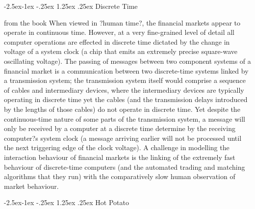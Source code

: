 \documentclass{article}
\makeatletter
\renewcommand\paragraph{\@startsection{paragraph}{4}{\z@}%
	{-2.5ex\@plus -1ex \@minus -.25ex}%
	{1.25ex \@plus .25ex}%
	{\normalfont\normalsize\bfseries}}
\makeatother
\begin{document}
\paragraph{Discrete Time} 

from the book
When viewed in ?human time?, the financial markets appear to operate in continuous time. However, at a very fine-grained level of detail all computer operations are effected in discrete time dictated by the change in voltage of a system clock (a chip that emits an extremely precise square-wave oscillating voltage).  The passing of messages between two component systems of a financial market is a communication between two discrete-time systems linked by a transmission system; the transmission system itself would comprise a sequence of cables and intermediary devices, where the intermediary devices are typically operating in discrete time yet the cables (and the transmission delays introduced by the lengths of those cables) do not operate in discrete time.  Yet despite the continuous-time nature of some parts of the transmission system, a message will only be received by a computer at a discrete time determine by the receiving computer?s system clock (a message arriving earlier will not be processed until the next triggering edge of the clock voltage).
A challenge in modelling the interaction behaviour of financial markets is the linking of the extremely fast behaviour of discrete-time computers (and the automated trading and matching algorithms that they run) with the comparatively slow human observation of market behaviour.  

\paragraph{Hot Potato} 

\end{document}
